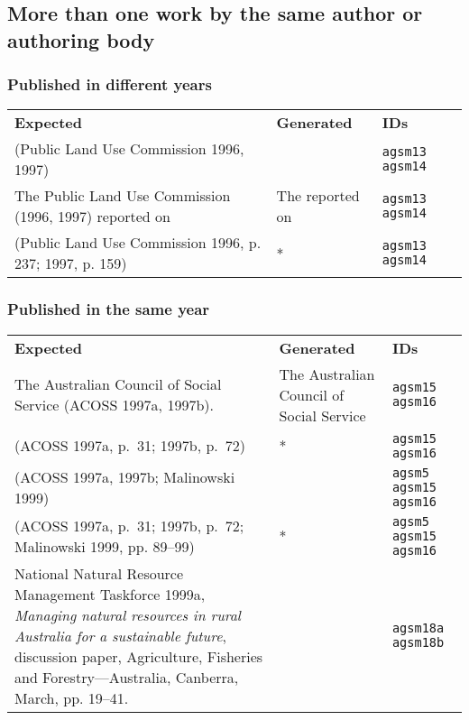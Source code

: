 \documentclass[a4paper,landscape,12pt]{article}
\newlength\q
\newlength\qr
\newenvironment{citetable}
  {\noindent\begin{longtable}{p{\q} p{\q} p{\qr}}\textbf{Expected} & \textbf{Generated} & \textbf{IDs}\\}
  {\end{longtable}}
\newcommand{\trivialissue}[1]{#1 *}
\begin{document}
\subsection{More than one work by the same author or authoring body}

\subsubsection{Published in different years}

\begin{citetable}
	(Public Land Use Commission 1996, 1997) & \parencite{agsm13, agsm14} & \texttt{agsm13} \texttt{agsm14} \\
	The Public Land Use Commission (1996, 1997) reported on & The \textcite{agsm13, agsm14} reported on & \texttt{agsm13} \texttt{agsm14} \\
	(Public Land Use Commission 1996, p. 237; 1997, p. 159) & \trivialissue{\parencites[p.~237]{agsm14}[p.~159]{agsm13}} & \texttt{agsm13} \texttt{agsm14} \\
\end{citetable}

\subsubsection{Published in the same year}

\begin{citetable}
	The Australian Council of Social Service \textellipsis{} (ACOSS 1997a, 1997b). & The Australian Council of Social Service \textellipsis{} \parencite{agsm15, agsm16} & \texttt{agsm15} \texttt{agsm16} \\
	(ACOSS 1997a, p.~31; 1997b, p.~72) & \trivialissue{\parencites[p.~31]{agsm15}[p.~72]{agsm16}} & \texttt{agsm15} \texttt{agsm16} \\
	(ACOSS 1997a, 1997b; Malinowski 1999) & \parencite{agsm5, agsm15, agsm16} & \texttt{agsm5} \texttt{agsm15} \texttt{agsm16} \\
	(ACOSS 1997a, p.~31; 1997b, p.~72; Malinowski 1999, pp. 89--99) & \trivialissue{\parencites[p.~31]{agsm15}[p.~72]{agsm16}[pp.~89--99]{agsm5}}& \texttt{agsm5} \texttt{agsm15} \texttt{agsm16} \\
	National Natural Resource Management Taskforce 1999a, \textit{Managing natural resources in rural Australia for a sustainable future}, discussion paper, Agriculture, Fisheries and Forestry---Australia, Canberra, March, pp. 19--41. & \fullcite{agsm18}\nocite{agsm18b} & \texttt{agsm18a} \texttt{agsm18b} \\
\end{citetable}
\end{document}
